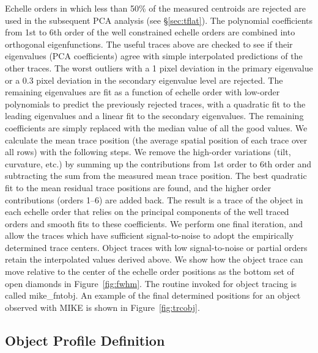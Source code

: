 \documentclass[12pt,preprint]{aastex}
\begin{document}
Echelle orders in which less than 50\% of the measured centroids 
are rejected are used in the subsequent PCA analysis (see \S\ref{sec:tflat}). 
The polynomial coefficients from 1st to 6th order of the well
constrained echelle orders are combined into orthogonal eigenfunctions.
The useful traces above are checked to see if their eigenvalues 
(PCA coefficients) agree with simple interpolated predictions of the 
other traces.  The worst outliers with a 1 pixel deviation in the primary 
eigenvalue or a 0.3 pixel deviation in the secondary eigenvalue level are 
rejected.  The remaining eigenvalues are fit as a function of 
echelle order with low-order polynomials to
predict the previously rejected traces, with a quadratic fit to the leading
eigenvalues and a linear fit to the secondary eigenvalues.  The remaining
coefficients are simply replaced with the median value of all the good 
values.   We calculate the mean trace position (the average spatial position
of each trace over all rows) with the following steps.  We remove the
high-order variations (tilt, curvature, etc.) by summing up the contributions
from 1st order to 6th order and subtracting the sum from the measured mean
trace position.  The best quadratic fit to the mean residual trace 
positions are found, and the higher order contributions (orders 1--6) are
added back.  The result is a trace of the object in each echelle order
that relies on the principal components of the well traced orders and
smooth fits to these coefficients.  We perform one final iteration, and
allow the traces which have sufficient signal-to-noise to adopt the 
empirically determined trace centers.  Object traces with low 
signal-to-noise or partial orders retain the interpolated values derived above.
We show how the object trace can
move relative to the center of the echelle order positions 
as the bottom set of open diamonds in Figure~\ref{fig:fwhm}.
The routine invoked for object tracing is called mike\_fntobj.
An example of the final determined positions for an object observed with
MIKE is shown in Figure~\ref{fig:trcobj}.  

\subsection{Object Profile Definition}
\end{document}
